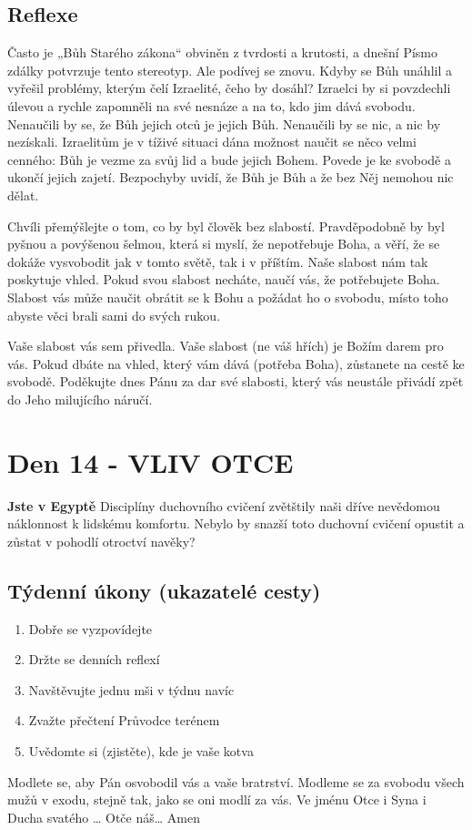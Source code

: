 \documentclass[11pt]{article}
\newcommand{\zacatekDruhyTyden}{
  \textbf{Jste v Egyptě} \newline
  Disciplíny duchovního cvičení zvětštily naši dříve nevědomou náklonnost k lidskému komfortu.
  Nebylo by snazší toto duchovní cvičení opustit a zůstat v pohodlí otroctví navěky?

  \subsection*{Týdenní úkony (ukazatelé cesty)}
\begin{enumerate}
  \item Dobře se vyzpovídejte
  \item Držte se denních reflexí
  \item Navštěvujte jednu mši v týdnu navíc
  \item Zvažte přečtení Průvodce terénem
  \item Uvědomte si (zjistěte), kde je vaše kotva
\end{enumerate}
Modlete se, aby Pán osvobodil vás a vaše bratrství. \newline
Modleme se za svobodu všech mužů v exodu, stejně tak, jako se oni modlí za vás.\newline
Ve jménu Otce i Syna i Ducha svatého …  Otče náš… Amen
}
\begin{document}
\subsection*{Reflexe}

Často je „Bůh Starého zákona“ obviněn z tvrdosti a krutosti, a dnešní Písmo zdálky potvrzuje tento stereotyp. Ale
podívej se znovu. Kdyby se Bůh unáhlil a vyřešil problémy, kterým čelí Izraelité, čeho by dosáhl? Izraelci by si
povzdechli úlevou a rychle zapomněli na své nesnáze a na to, kdo jim dává svobodu. Nenaučili by se, že Bůh jejich
otců je jejich Bůh. Nenaučili by se nic, a nic by nezískali. Izraelitům je v tíživé situaci dána možnost naučit se něco
velmi cenného: Bůh je vezme za svůj lid a bude jejich Bohem. Povede je ke svobodě a ukončí jejich zajetí.
Bezpochyby uvidí, že Bůh je Bůh a že bez Něj nemohou nic dělat.

Chvíli přemýšlejte o tom, co by byl člověk bez slabostí. Pravděpodobně by byl pyšnou a povýšenou šelmou, která si
myslí, že nepotřebuje Boha, a věří, že se dokáže vysvobodit jak v tomto světě, tak i v příštím. Naše slabost nám tak
poskytuje vhled. Pokud svou slabost necháte, naučí vás, že potřebujete Boha. Slabost vás může naučit obrátit se
k Bohu a požádat ho o svobodu, místo toho abyste věci brali sami do svých rukou.

Vaše slabost vás sem přivedla. Vaše slabost (ne váš hřích) je Božím darem pro vás. Pokud dbáte na vhled, který vám
dává (potřeba Boha), zůstanete na cestě ke svobodě. Poděkujte dnes Pánu za dar své slabosti, který vás neustále
přivádí zpět do Jeho milujícího náručí.

\newpage
\section{Den 14 - VLIV OTCE}
\zacatekDruhyTyden
\end{document}
